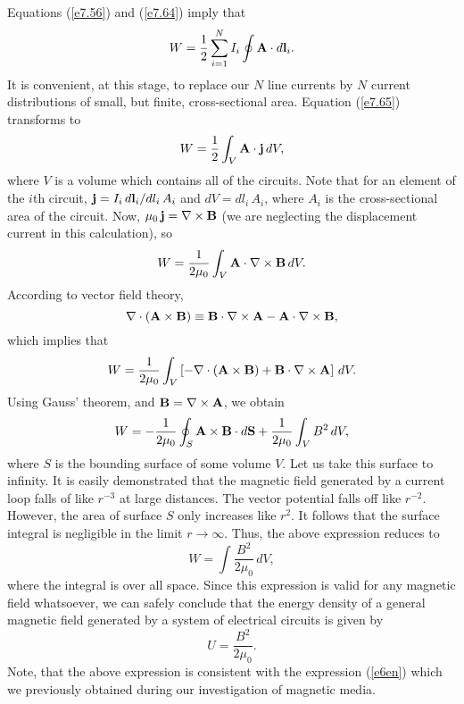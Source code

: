 Equations (\ref{e7.56}) and (\ref{e7.64}) imply that
\begin{equation}\label{e7.65}
W = \frac{1}{2} \sum_{i=1}^N I_i \oint {\bf A} \cdot d{\bf l}_i.
\end{equation}
It is convenient, at this stage, to replace our $N$ line currents by
$N$  current
distributions  of
small, but finite, cross-sectional area.
Equation (\ref{e7.65})
transforms to
\begin{equation}
W = \frac{1}{2} \int_V {\bf A} \cdot {\bf j} \, dV,
\end{equation}
where $V$ is a volume which contains all of the circuits.
Note that for an element of the $i$th circuit, ${\bf j} =I_i\, d{\bf l}_i
/dl_i \,A_i$ and  $dV = dl_i \,A_i$, where $A_i$ is the cross-sectional area of the
 circuit.
Now, $\mu_0\, {\bf j} = \nabla\times {\bf B}$ (we are neglecting the displacement
current in this calculation), so
\begin{equation}
W = \frac{1}{2\mu_0} \int_V {\bf A} \cdot \nabla\times{\bf B} \, dV.
\end{equation}
According to vector field theory,
\begin{equation}
\nabla\cdot({\bf A} \times{\bf B}) \equiv {\bf B} \cdot \nabla\times{\bf A} -
{\bf A} \cdot \nabla\times{\bf B},
\end{equation}
which implies that
\begin{equation}
W = \frac{1}{2\mu_0} \int_V \left[- \nabla\cdot ({\bf A} \times{\bf B})
+{\bf B}\cdot \nabla \times {\bf A} \right] \,dV.
\end{equation}
Using Gauss' theorem, and ${\bf B} = \nabla\times{\bf A}$, we obtain
\begin{equation}
W = -\frac{1}{2\mu_0} \oint_S {\bf A}\times{\bf B} \cdot d{\bf S} +
\frac{1}{2\mu_0} \int_V B^2\,dV,
\end{equation}
where $S$ is the bounding surface of  some volume $V$. Let us take this surface
to infinity. It is easily demonstrated that the magnetic field generated by a current
loop falls of like $r^{-3}$ at large distances. The vector potential
falls off like $r^{-2}$. However, the  area of surface $S$ only increases like $r^2$. 
It follows that the surface integral is negligible in the limit $r\rightarrow\infty$.
Thus, the above expression reduces to
\begin{equation}
W = \int \frac{B^2}{2\mu_0} \, dV,
\end{equation}
where the integral is over all space.
Since this expression is valid for any magnetic field whatsoever, we can safely conclude 
that the energy density of a general magnetic field generated by a system of electrical circuits is given by
\begin{equation}
U = \frac{B^2}{2\mu_0}.
\end{equation}
Note, that the above expression is consistent with the expression
(\ref{e6en}) which we previously obtained during our investigation of magnetic
media.

